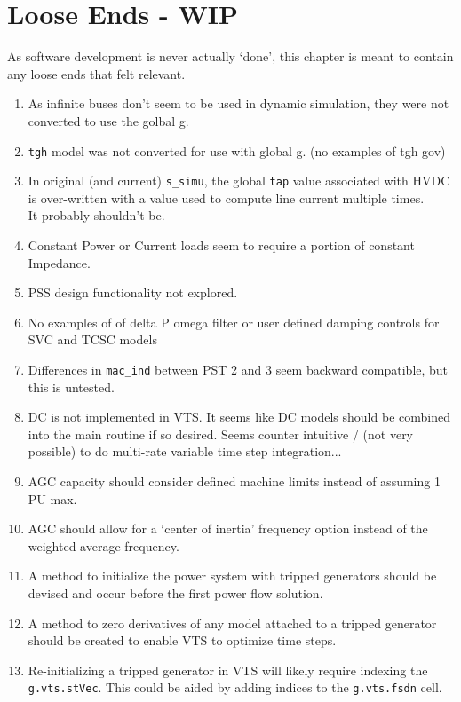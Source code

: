 \chapter{Loose Ends - WIP}
As software development is never actually `done', this chapter is meant to contain any loose ends that felt relevant.

\begin{enumerate}
	\item As infinite buses don't seem to be used in dynamic simulation, they were not converted to use the golbal g.
	\item \verb|tgh| model was not converted for use with global g. (no examples of tgh gov)
	\item In original (and current) \verb|s_simu|, the global \verb|tap| value associated with HVDC is over-written with  a value used to compute line current multiple times. \\It probably shouldn't be.
	\item Constant Power or Current loads seem to require a portion of constant Impedance.
	\item PSS design functionality not explored.
	\item No examples of of delta P omega filter or user defined damping controls for SVC and TCSC models
	\item Differences in \verb|mac_ind| between PST 2 and 3 seem backward compatible, but this is untested.
	\item DC is not implemented in VTS. It seems like DC models should be combined into the main routine if so desired. Seems counter intuitive / (not very possible) to do multi-rate variable time step integration...
	\item AGC capacity should consider defined machine limits instead of assuming 1 PU max.
	\item AGC should allow for a `center of inertia' frequency option instead of the weighted average frequency.
	\item A method to initialize the power system with tripped generators should be devised and occur before the first power flow solution.
	\item A method to zero derivatives of any model attached to a tripped generator should be created to enable VTS to optimize time steps.
	\item Re-initializing a tripped generator in VTS will likely require indexing the \verb|g.vts.stVec|. This could be aided by adding indices to the \verb|g.vts.fsdn| cell.

\end{enumerate}
